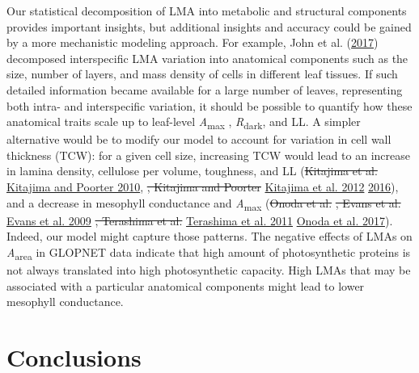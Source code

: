 \documentclass[
  12pt,
]{article}
\providecommand{\DIFaddtex}[1]{{\protect\color{blue}\uwave{#1}}} %
\providecommand{\DIFdeltex}[1]{{\protect\color{red}\sout{#1}}}                      %
\providecommand{\DIFaddbegin}{} %
\providecommand{\DIFaddend}{} %
\providecommand{\DIFdelbegin}{} %
\providecommand{\DIFdelend}{} %
\providecommand{\DIFadd}[1]{\texorpdfstring{\DIFaddtex{#1}}{#1}} %
\providecommand{\DIFdel}[1]{\texorpdfstring{\DIFdeltex{#1}}{}} %
\newcommand{\DIFscaledelfig}{0.5}
\newlength{\DIFdelgraphicswidth} %
\newlength{\DIFdelgraphicsheight} %
\newcommand{\DIFaddincludegraphics}[2][]{{\color{blue}\fbox{\DIFOincludegraphics[#1]{#2}}}} %
\newcommand{\DIFdelincludegraphics}[2][]{%
\sbox{\DIFdelgraphicsbox}{\DIFOincludegraphics[#1]{#2}}%
\settoboxwidth{\DIFdelgraphicswidth}{\DIFdelgraphicsbox} %
\settoboxtotalheight{\DIFdelgraphicsheight}{\DIFdelgraphicsbox} %
\scalebox{\DIFscaledelfig}{%
\parbox[b]{\DIFdelgraphicswidth}{\usebox{\DIFdelgraphicsbox}\\[-\baselineskip] \rule{\DIFdelgraphicswidth}{0em}}\llap{\resizebox{\DIFdelgraphicswidth}{\DIFdelgraphicsheight}{%
\setlength{\unitlength}{\DIFdelgraphicswidth}%
\begin{picture}(1,1)%
\thicklines\linethickness{2pt} %
{\color[rgb]{1,0,0}\put(0,0){\framebox(1,1){}}}%
{\color[rgb]{1,0,0}\put(0,0){\line( 1,1){1}}}%
{\color[rgb]{1,0,0}\put(0,1){\line(1,-1){1}}}%
\end{picture}%
}\hspace*{3pt}}} %
} %
\DeclareRobustCommand{\DIFaddbegin}{\DIFOaddbegin \let\includegraphics\DIFaddincludegraphics} %
\DeclareRobustCommand{\DIFaddend}{\DIFOaddend \let\includegraphics\DIFOincludegraphics} %
\DeclareRobustCommand{\DIFdelbegin}{\DIFOdelbegin \let\includegraphics\DIFdelincludegraphics} %
\DeclareRobustCommand{\DIFdelend}{\DIFOaddend \let\includegraphics\DIFOincludegraphics} %
\begin{document}
Our statistical decomposition of LMA into metabolic and structural components provides important insights, but additional insights and accuracy could be gained by a more mechanistic modeling approach.
For example, John et al. (\protect\hyperlink{ref-John2017}{2017}) decomposed interspecific LMA variation into anatomical components such as the size, number of layers, and mass density of cells in different leaf tissues.
If such detailed information became available for a large number of leaves, representing both intra- and interspecific variation, it should be possible to quantify how these anatomical traits scale up to leaf-level \emph{A}\textsubscript{max} , \emph{R}\textsubscript{dark}, and LL.
A simpler alternative would be to modify our model to account for variation in cell wall thickness (TCW): for a given cell size, increasing TCW would lead to an increase in lamina density, cellulose per volume, toughness, and LL (\DIFdelbegin \DIFdel{Kitajima et al. }\DIFdelend \protect\DIFdelbegin %
\DIFdelend \DIFaddbegin \hyperlink{ref-Kitajima2010}{Kitajima and Poorter 2010}\DIFaddend , \protect\DIFdelbegin %
\DIFdel{, Kitajima and Poorter }\DIFdelend \DIFaddbegin \hyperlink{ref-Kitajima2012}{Kitajima et al. 2012}\DIFadd{, }\DIFaddend \protect\DIFdelbegin %
\DIFdelend \DIFaddbegin \hyperlink{ref-Kitajima2016}{2016}\DIFaddend ), and a decrease in mesophyll conductance and \emph{A}\textsubscript{max} (\DIFdelbegin \DIFdel{Onoda et al. }\DIFdelend \protect\DIFdelbegin %
\DIFdel{, Evans et al. }\DIFdelend \DIFaddbegin \hyperlink{ref-Evans2009}{Evans et al. 2009}\DIFadd{, }\DIFaddend \protect\DIFdelbegin %
\DIFdel{, Terashima et al. }\DIFdelend \DIFaddbegin \hyperlink{ref-Terashima2011}{Terashima et al. 2011}\DIFadd{, }\DIFaddend \protect\DIFdelbegin %
\DIFdelend \DIFaddbegin \hyperlink{ref-Onoda2017}{Onoda et al. 2017}\DIFaddend ).
Indeed, our model might capture those patterns. The negative effects of LMAs on \emph{A}\textsubscript{area} in GLOPNET data indicate that high amount of photosynthetic proteins is not always translated into high photosynthetic capacity.
High LMAs that may be associated with a particular anatomical components might lead to lower mesophyll conductance.

\hypertarget{conclusions}{%
\section{Conclusions}\label{conclusions}}
\end{document}

